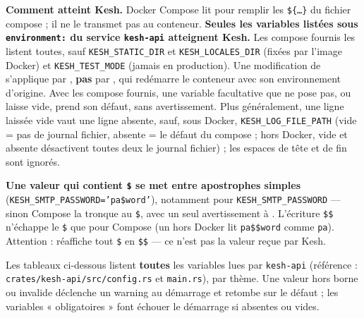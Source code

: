 \documentclass[a4paper,11pt,oneside]{article}
\begin{document}
\begin{sloppypar}
\textbf{Comment  atteint Kesh.} Docker Compose lit  pour remplir les \texttt{\$\{…\}} du fichier compose ; il ne le transmet pas au conteneur. \textbf{Seules les variables listées sous \texttt{environment:} du service \texttt{kesh-api} atteignent Kesh.} Les compose fournis les listent toutes, sauf \texttt{KESH\_STATIC\_DIR} et \texttt{KESH\_LOCALES\_DIR} (fixées par l'image Docker) et \texttt{KESH\_TEST\_MODE} (jamais en production). Une modification de  s'applique par , \textbf{pas} par , qui redémarre le conteneur avec son environnement d'origine. Avec les compose fournis, une variable facultative que  ne pose pas, ou laisse vide, prend son défaut, sans avertissement. Plus généralement, une ligne laissée vide vaut une ligne absente, sauf, sous Docker, \texttt{KESH\_LOG\_FILE\_PATH} (vide = pas de journal fichier, absente = le défaut du compose ; hors Docker, vide et absente désactivent toutes deux le journal fichier) ; les espaces de tête et de fin sont ignorés.
\end{sloppypar}

\begin{sloppypar}
\textbf{Une valeur qui contient \texttt{\$} se met entre apostrophes simples} (\texttt{KESH\_SMTP\_PASSWORD='pa\$word'}), notamment pour \texttt{KESH\_SMTP\_PASSWORD} — sinon Compose la tronque au \texttt{\$}, avec un seul avertissement à . L'écriture \texttt{\$\$} n'échappe le \texttt{\$} que pour Compose (un  hors Docker lit \texttt{pa\$\$word} comme \texttt{pa}). Attention :  réaffiche tout \texttt{\$} en \texttt{\$\$} — ce n'est pas la valeur reçue par Kesh.
\end{sloppypar}

\begin{sloppypar}
Les tableaux ci-dessous listent \textbf{toutes} les variables lues par
\texttt{kesh-api} (référence : \texttt{crates/kesh-api/src/config.rs} et
\texttt{main.rs}), par thème. Une valeur hors borne ou invalide déclenche un
warning au démarrage et retombe sur le défaut ; les variables « obligatoires »
font échouer le démarrage si absentes ou vides.
\end{sloppypar}
\end{document}
